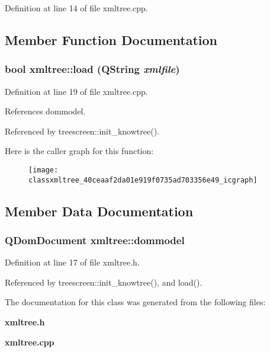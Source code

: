 Definition at line 14 of file xmltree.cpp.

\subsection{Member Function Documentation}
\subsubsection{\setlength{\rightskip}{0pt plus 5cm}bool xmltree::load (QString {\em xmlfile})}\label{classxmltree_40ceaaf2da01e919f0735ad703356e49}




Definition at line 19 of file xmltree.cpp.

References dommodel.

Referenced by treescreen::init\_\-knowtree().

Here is the caller graph for this function:\begin{figure}[H]
\begin{center}
\leavevmode
\texttt{[image: classxmltree\_40ceaaf2da01e919f0735ad703356e49\_icgraph]}
\end{center}
\end{figure}


\subsection{Member Data Documentation}
\subsubsection{\setlength{\rightskip}{0pt plus 5cm}QDom\-Document {\bf xmltree::dommodel}}\label{classxmltree_6b469b6c9de2ec31c4ba1c8444ba5994}




Definition at line 17 of file xmltree.h.

Referenced by treescreen::init\_\-knowtree(), and load().

The documentation for this class was generated from the following files:\begin{CompactItemize}
\item 
{\bf xmltree.h}\item 
{\bf xmltree.cpp}\end{CompactItemize}
